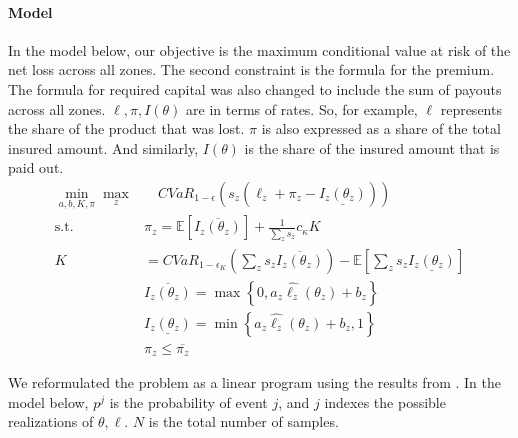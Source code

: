 \documentclass[11pt]{article}
\begin{document}
  \paragraph*{Model}
  In the model below, our objective is the maximum conditional value at risk of the net loss across all zones. The second constraint is the formula for the premium. The formula for required capital was also changed to include the sum of payouts across all zones. $\ell, \pi, I(\theta)$ are in terms of rates. So, for example, $\ell$ represents the share of the product that was lost. $\pi$ is also expressed as a share of the total insured amount. And similarly, $I(\theta)$ is the share of the insured amount that is paid out.
  \begin{align}
    \min_{a,b,K,\pi} \max_z &\quad CVaR_{1-\epsilon}\left (s_z \left (\ell_z  + \pi_z - \underline{I_z(\theta_z)}\right ) \right )\\
    \text{s.t.   } & \pi_z  = \mathbb{E}\left [ \overline{I_z(\theta_z)} \right ] + \frac{1}{\sum_z s_z} c_{\kappa} K \\
    K &= CVaR_{1-\epsilon_K} \left( \sum_z s_z\overline{I_z(\theta_z)} \right ) - \mathbb{E}\left [ \sum_z s_z\underline{I_z(\theta_z)} \right ]\\
    &\overline{I_z(\theta_z)} = \max \left \{0,a_z\hat{\ell_z}(\theta_z) + b_z \right \}\\
    &\underline{I_z(\theta_z)} = \min \left \{a_z\hat{\ell_z}(\theta_z)+b_z,1 \right \}\\
    &\pi_z \leq \overline{\pi_z}
  \end{align}

  We reformulated the problem as a linear program  using the results from \cite{rockafellar2000optimization}. In the model below, $p^j$ is the probability of event $j$, and $j$ indexes the possible realizations of $\theta, \ell$. $N$ is the total number of samples. 
\end{document}
